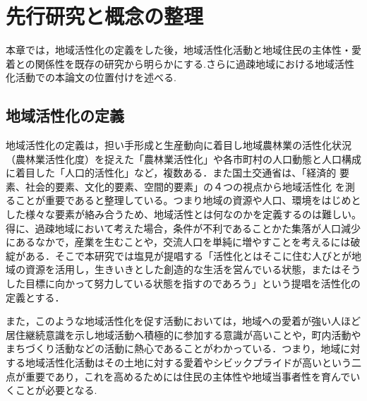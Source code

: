 \documentclass[a4paper]{jsarticle}
\begin{document}
\section{先行研究と概念の整理}
本章では，地域活性化の定義をした後，地域活性化活動と地域住民の主体性・愛着との関係性を既存の研究から明らかにする.さらに過疎地域における地域活性化活動での本論文の位置付けを述べる.
\subsection{地域活性化の定義}
地域活性化の定義は，担い手形成と生産動向に着目し地域農林業の活性化状況（農林業活性化度）を捉えた「農林業活性化」や各市町村の人口動態と人口構成に着目した「人口的活性化」など，複数ある．また国土交通省は、「経済的
要素、社会的要素、文化的要素、空間的要素」の４つの視点から地域活性化
を測ることが重要である\cite{kasseika}と整理している。つまり地域の資源や人口、環境をはじめとした様々な要素が絡み合うため、地域活性とは何なのかを定義するのは難しい。得に、過疎地域において考えた場合，条件が不利であることかた集落が人口減少にあるなかで，産業を生むことや，交流人口を単純に増やすことを考えるには破綻がある．そこで本研究では塩見\cite{shiomi}が提唱する「活性化とはそこに住む人びとが地域の資源を活用し，生きいきとした創造的な生活を営んでいる状態，またはそうした目標に向かって努力している状態を指すのであろう」という提唱を活性化の定義とする．\par
また，このような地域活性化を促す活動においては，地域への愛着が強い人ほど居住継続意識を示し地域活動へ積極的に参加する意識が高いことや，町内活動やまちづくり活動などの活動に熱心であること\cite{7}がわかっている．つまり，地域に対する地域活性化活動はその土地に対する愛着やシビックプライドが高いという二点が重要であり，これを高めるためには住民の主体性や地域当事者性を育んでいくことが必要となる.\par
\end{document}
